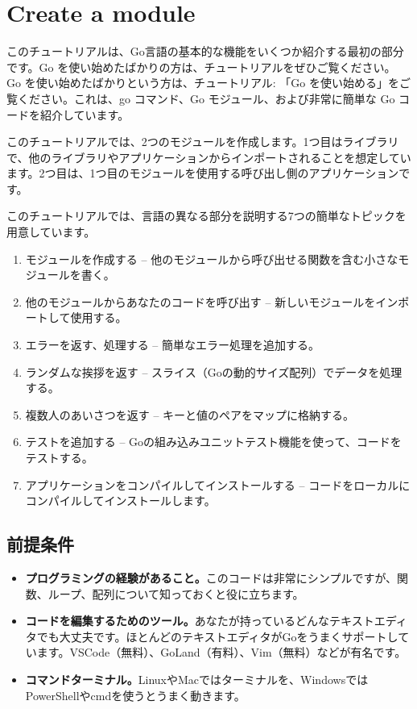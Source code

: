 \section{Create a module}

このチュートリアルは、Go言語の基本的な機能をいくつか紹介する最初の部分です。Go を使い始めたばかりの方は、チュートリアルをぜひご覧ください。
Go を使い始めたばかりという方は、チュートリアル: 「Go を使い始める」をご覧ください。これは、go コマンド、Go モジュール、および非常に簡単な Go コードを紹介しています。

このチュートリアルでは、2つのモジュールを作成します。1つ目はライブラリで、他のライブラリやアプリケーションからインポートされることを想定しています。2つ目は、1つ目のモジュールを使用する呼び出し側のアプリケーションです。

このチュートリアルでは、言語の異なる部分を説明する7つの簡単なトピックを用意しています。

\begin{enumerate}
\item モジュールを作成する -- 他のモジュールから呼び出せる関数を含む小さなモジュールを書く。
\item 他のモジュールからあなたのコードを呼び出す -- 新しいモジュールをインポートして使用する。
\item エラーを返す、処理する -- 簡単なエラー処理を追加する。
\item ランダムな挨拶を返す -- スライス（Goの動的サイズ配列）でデータを処理する。
\item 複数人のあいさつを返す -- キーと値のペアをマップに格納する。
\item テストを追加する -- Goの組み込みユニットテスト機能を使って、コードをテストする。
\item アプリケーションをコンパイルしてインストールする -- コードをローカルにコンパイルしてインストールします。
\end{enumerate}

\subsection{前提条件}

\begin{itemize}
\item \textbf{プログラミングの経験があること。}このコードは非常にシンプルですが、関数、ループ、配列について知っておくと役に立ちます。
\item \textbf{コードを編集するためのツール。}あなたが持っているどんなテキストエディタでも大丈夫です。ほとんどのテキストエディタがGoをうまくサポートしています。VSCode（無料）、GoLand（有料）、Vim（無料）などが有名です。
\item \textbf{コマンドターミナル。}LinuxやMacではターミナルを、WindowsではPowerShellやcmdを使うとうまく動きます。
\end{itemize}

